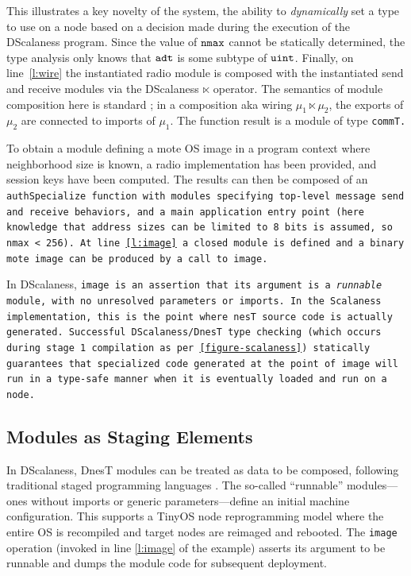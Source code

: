 This illustrates a key novelty of the system, the ability to \emph{dynamically} set a type to
use on a node based on a decision made during the execution of the DScalaness program. Since the
value of $\tt{nmax}$ cannot be statically determined, the type analysis only knows that
$\tt{adt}$ is some subtype of $\tt{uint}$. Finally, on line~\ref{l:wire} the instantiated radio
module is composed with the instantiated send and receive modules via the DScalaness $\ltimes$
operator. The semantics of module composition here is standard \cite{Cardelli-1997}; in a
composition aka wiring $\mu_1 \ltimes \mu_2$, the exports of $\mu_2$ are connected to imports of
$\mu_1$. The function result is a module of type \tt{commT}.

To obtain a module defining a mote OS image in a program context where neighborhood size is
known, a radio implementation has been provided, and session keys have been computed. The
results can then be composed of an \tt{authSpecialize} function with modules specifying
top-level message send and receive behaviors, and a \texttt{main} application entry point (here
knowledge that address sizes can be limited to 8 bits is assumed, so \tt{nmax} < 256). At line
\ref{l:image} a closed module is defined and a binary mote image can be produced by a call to
\tt{image}.

In DScalaness, \tt{image} is an assertion that its argument is a \emph{runnable} module, with no
unresolved parameters or imports. In the Scalaness implementation, this is the point where nesT
source code is actually generated. Successful DScalaness/DnesT type checking (which occurs
during stage 1 compilation as per \autoref{figure-scalaness}) statically guarantees that
specialized code generated at the point of \tt{image} will run in a type-safe manner when it is
eventually loaded and run on a node.

\subsection{Modules as Staging Elements}

In DScalaness, DnesT modules can be treated as data to be composed, following traditional staged
programming languages \cite{Taha-MetaML}. The so-called ``runnable'' modules---ones without
imports or generic parameters---define an initial machine configuration. This supports a TinyOS
node reprogramming model where the entire OS is recompiled and target nodes are reimaged and
rebooted. The \texttt{image} operation (invoked in line \ref{l:image} of the example) asserts
its argument to be runnable and dumps the module code for subsequent deployment.

